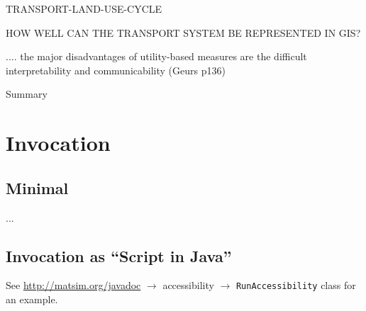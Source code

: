 
TRANSPORT-LAND-USE-CYCLE

HOW WELL CAN THE TRANSPORT SYSTEM BE REPRESENTED IN GIS?

.... the major disadvantages of utility-based measures are the difficult interpretability and communicability (Geurs p136)




Summary







\section{Invocation}

\subsection{Minimal}

...



\subsection{Invocation as ``Script in Java''}

See \url{http://matsim.org/javadoc} $\to$ accessibility $\to$ \lstinline{RunAccessibility} class for an example.




